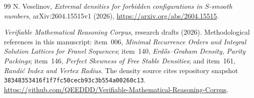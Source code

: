 \documentclass[11pt,a4paper]{article}
\theoremstyle{remark}\newtheorem{remark}[theorem]{Remark}
\numberwithin{equation}{section}
\begin{document}
\begin{thebibliography}{99}
N. Veselinov, \emph{Extremal densities for forbidden
configurations in $S$-smooth numbers}, arXiv:2604.15515v1 (2026),
\url{https://arxiv.org/abs/2604.15515}.

\emph{Verifiable Mathematical Reasoning Corpus}, research drafts (2026).
Methodological references in this manuscript: item~006,
\emph{Minimal Recurrence Orders and Integral Solution Lattices for Franel Sequences};
item~140, \emph{Erd\H{o}s--Graham Density, Parity Packings};
item~146, \emph{Perfect Skewness of Free Stable Densities}; and
item~161, \emph{Randi\'c Index and Vertex Radius}.
The density source cites repository snapshot
\texttt{38348353416f1f7fc50cecb93c3b554a00260c13}.
\url{https://github.com/QEEDDD/Verifiable-Mathematical-Reasoning-Corpus}.
\end{thebibliography}
\end{document}
